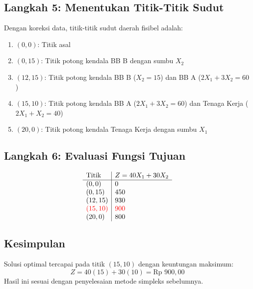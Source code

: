 \documentclass[12pt,a4paper]{article}
\begin{document}
\subsection*{Langkah 5: Menentukan Titik-Titik Sudut}
Dengan koreksi data, titik-titik sudut daerah fisibel adalah:
\begin{enumerate}
    \item $(0,0)$: Titik asal
    \item $(0,15)$: Titik potong kendala BB B dengan sumbu $X_2$
    \item $(12,15)$: Titik potong kendala BB B ($X_2=15$) dan BB A ($2X_1 + 3X_2=60$)
    \item $(15,10)$: Titik potong kendala BB A ($2X_1 + 3X_2=60$) dan Tenaga Kerja ($2X_1 + X_2=40$)
    \item $(20,0)$: Titik potong kendala Tenaga Kerja dengan sumbu $X_1$
\end{enumerate}

\subsection*{Langkah 6: Evaluasi Fungsi Tujuan}
$$
\begin{array}{l|l}
\text{Titik} & Z = 40X_1 + 30X_2 \\
\hline
(0,0) & 0 \\
(0,15) & 450 \\
(12,15) & 930 \\
\textcolor{red}{(15,10)} & \textcolor{red}{900} \\
(20,0) & 800 \\
\end{array}
$$

\subsection*{Kesimpulan}
Solusi optimal tercapai pada titik $(15,10)$ dengan keuntungan maksimum:
$$
Z = 40(15) + 30(10) = \text{Rp }900,00
$$
Hasil ini sesuai dengan penyelesaian metode simpleks sebelumnya.
\end{document}
